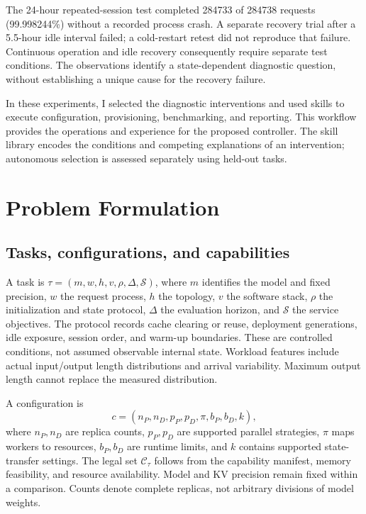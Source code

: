 \documentclass[11pt,a4paper]{article}
\begin{document}
The 24-hour repeated-session test completed 284733 of 284738 requests (99.998244\%) without a recorded process crash. A separate recovery trial after a 5.5-hour idle interval failed; a cold-restart retest did not reproduce that failure. Continuous operation and idle recovery consequently require separate test conditions. The observations identify a state-dependent diagnostic question, without establishing a unique cause for the recovery failure.

In these experiments, I selected the diagnostic interventions and used skills to execute configuration, provisioning, benchmarking, and reporting. This workflow provides the operations and experience for the proposed controller. The skill library encodes the conditions and competing explanations of an intervention; autonomous selection is assessed separately using held-out tasks.

\section{Problem Formulation}
\subsection{Tasks, configurations, and capabilities}
A task is $\tau=(m,w,h,v,\rho,\Delta,\mathcal{S})$, where $m$ identifies the model and fixed precision, $w$ the request process, $h$ the topology, $v$ the software stack, $\rho$ the initialization and state protocol, $\Delta$ the evaluation horizon, and $\mathcal{S}$ the service objectives. The protocol records cache clearing or reuse, deployment generations, idle exposure, session order, and warm-up boundaries. These are controlled conditions, not assumed observable internal state. Workload features include actual input/output length distributions and arrival variability. Maximum output length cannot replace the measured distribution.

A configuration is
\begin{equation}
 c=(n_P,n_D,p_P,p_D,\pi,b_P,b_D,k),
\end{equation}
where $n_P,n_D$ are replica counts, $p_P,p_D$ are supported parallel strategies, $\pi$ maps workers to resources, $b_P,b_D$ are runtime limits, and $k$ contains supported state-transfer settings. The legal set $\mathcal{C}_{\tau}$ follows from the capability manifest, memory feasibility, and resource availability. Model and KV precision remain fixed within a comparison. Counts denote complete replicas, not arbitrary divisions of model weights.
\end{document}
